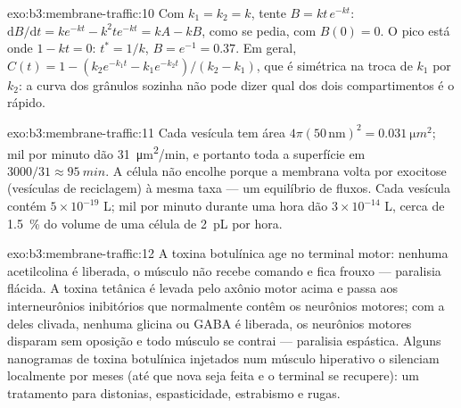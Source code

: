\begin{solution}{exo:b3:membrane-traffic:10}
Com $k_{1} = k_{2} = k$, tente $B = kt\,e^{-kt}$:
$\mathrm{d}B/\mathrm{d}t
= k e^{-kt} - k^{2}t e^{-kt} = kA - kB$, como
se pedia, com $B(0) = 0$. O pico está onde $1 - kt = 0$: $t^{*} = 1/k$,
$B = e^{-1} = 0.37$. Em geral,
$C(t) = 1 - (k_{2}e^{-k_{1}t} - k_{1}e^{-k_{2}t})/(k_{2} - k_{1})$, que
é simétrica na troca de $k_{1}$ por $k_{2}$: a curva dos grânulos
sozinha não pode dizer qual dos dois compartimentos é o rápido.
\end{solution}

\begin{solution}{exo:b3:membrane-traffic:11}
Cada vesícula tem área $4\pi(50\,\text{nm})^{2} = \qty{0.031}{\micro
m^2}$; mil por minuto dão \qty{31}{\micro m^2/min}, e portanto toda a
superfície em $3000/31 \approx \qty{95}{min}$. A célula não encolhe
porque a membrana volta por exocitose (vesículas de reciclagem) à mesma
taxa --- um equilíbrio de fluxos. Cada vesícula contém
$5\times 10^{-19}$ L; mil por minuto durante uma hora dão
$3\times 10^{-14}$ L, cerca de \qty{1.5}{\%} do volume de uma célula de
\qty{2}{pL} por hora.
\end{solution}

\begin{solution}{exo:b3:membrane-traffic:12}
A toxina botulínica age no terminal motor: nenhuma acetilcolina é
liberada, o músculo não recebe comando e fica frouxo --- paralisia
flácida. A toxina tetânica é levada pelo axônio motor acima e passa aos
interneurônios inibitórios que normalmente contêm os neurônios motores;
com a  deles clivada, nenhuma glicina ou GABA é liberada, os
neurônios motores disparam sem oposição e todo músculo se contrai ---
paralisia espástica. Alguns nanogramas de toxina botulínica injetados
num músculo hiperativo o silenciam localmente por meses (até que nova
 seja feita e o terminal se recupere): um tratamento para
distonias, espasticidade, estrabismo e rugas.
\end{solution}

